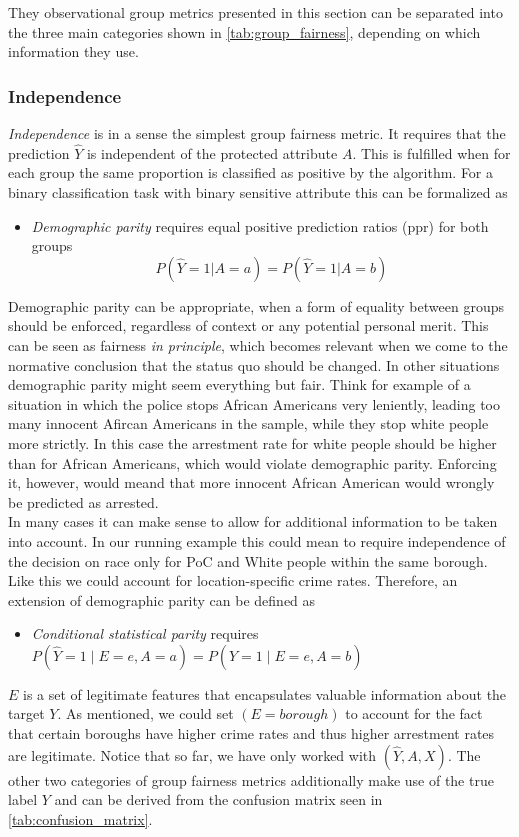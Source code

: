 They observational group metrics presented in this section can be separated into the three main categories shown in \autoref{tab:group_fairness}, depending on which information they use.

\subsubsection*{Independence}
\textit{Independence} is in a sense the simplest group fairness metric. It requires that the prediction $\hat{Y}$ is independent of the protected attribute $A$. This is fulfilled when for each group the same proportion is classified as positive by the algorithm. For a binary classification task with binary sensitive attribute this can be formalized as
\begin{itemize}
    \item \textit{Demographic parity} requires equal positive prediction ratios (ppr) for both groups $$P(\hat{Y} = 1 | A = a) = P(\hat{Y} = 1 | A = b)$$
\end{itemize}
Demographic parity can be appropriate, when a form of equality between groups should be enforced, regardless of context or any potential personal merit.
This can be seen as fairness \textit{in principle}, which becomes relevant when we come to the normative conclusion that the status quo should be changed. In other situations demographic parity might seem everything but fair. Think for example of a situation in which the police stops African Americans very leniently, leading too many innocent Afircan Americans in the sample, while they stop white people more strictly. In this case the arrestment rate for white people should be higher than for African Americans, which would violate demographic parity. Enforcing it, however, would meand that more innocent African American would wrongly be predicted as arrested.\\
In many cases it can make sense to allow for additional information to be taken into account. In our running example this could mean to require independence of the decision on race only for PoC and White people within the same borough. Like this we could account for location-specific crime rates. Therefore, an extension of demographic parity can be defined as
\begin{itemize}
    \item \textit{Conditional statistical parity} requires $P(\hat{Y} = 1 \mid E = e, A = a) = P(\hat{Y} = 1 \mid E = e, A = b)$
\end{itemize}
$E$ is a set of legitimate features that encapsulates valuable information about the target $Y$. As mentioned, we could set $(E = borough)$ to account for the fact that certain boroughs have higher crime rates and thus higher arrestment rates are legitimate.
Notice that so far, we have only worked with $(\hat{Y},A,X)$. The other two categories of group fairness metrics additionally make use of the true label $Y$ and can be derived from the confusion matrix seen in \autoref{tab:confusion_matrix}.


